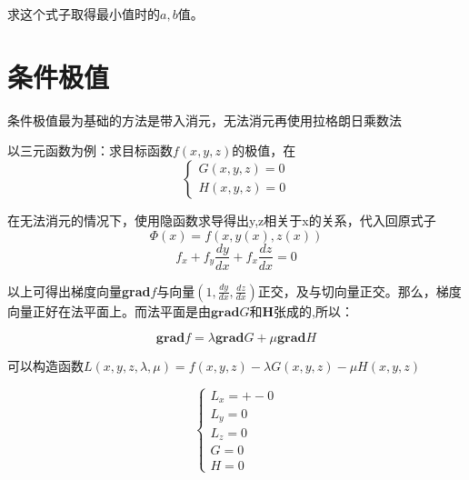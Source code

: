 \documentclass[10pt, a4paper]{article}
\begin{document}
                求这个式子取得最小值时的$a, b$值。
    \section{条件极值}
        条件极值最为基础的方法是带入消元，无法消元再使用拉格朗日乘数法

        以三元函数为例：求目标函数$f(x, y, z)$的极值，在
        $$
            \begin{cases}
                G(x, y, z) = 0\\
                H(x, y, z) = 0 
            \end{cases}
        $$

        在无法消元的情况下，使用隐函数求导得出y,z相关于x的关系，代入回原式子
        $$\Phi(x) = f(x, y(x), z(x))$$
        $$f_x + f_y\frac{dy}{dx} + f_x\frac{dz}{dx} = 0$$
    
        以上可得出梯度向量\textbf{grad}$f$与向量$(1, \frac{dy}{dx}, \frac{dz}{dx})$正交，及与切向量正交。那么，梯度向量正好在法平面上。而法平面是由$\textbf{grad}G$和$\textbf{H}$张成的,所以：

        $$\textbf{grad}f = \lambda\textbf{grad}G + \mu\textbf{grad}H$$

        可以构造函数$L(x,y,z,\lambda,\mu) = f(x, y,z) - \lambda G(x,y,z) - \mu H(x,y,z)$

        $$
        \begin{cases}
            L_x = +-0 \\
            L_y = 0 \\
            L_z = 0 \\
            G = 0 \\
            H = 0
        \end{cases}
        $$
    
\end{document}
